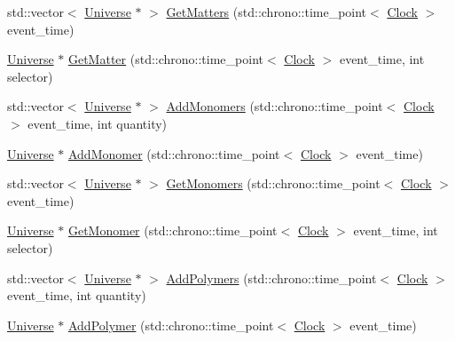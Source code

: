 \begin{DoxyCompactItemize}
\item 
std\+::vector$<$ \mbox{\hyperlink{classUniverse}{Universe}} $\ast$ $>$ \mbox{\hyperlink{classUniverse_a4307a62e183fed8cf2b92be0f6014688}{Get\+Matters}} (std\+::chrono\+::time\+\_\+point$<$ \mbox{\hyperlink{universe_8h_a0ef8d951d1ca5ab3cfaf7ab4c7a6fd80}{Clock}} $>$ event\+\_\+time)
\item 
\mbox{\hyperlink{classUniverse}{Universe}} $\ast$ \mbox{\hyperlink{classUniverse_a69de663cf2e32e65ed28c44ae666db3a}{Get\+Matter}} (std\+::chrono\+::time\+\_\+point$<$ \mbox{\hyperlink{universe_8h_a0ef8d951d1ca5ab3cfaf7ab4c7a6fd80}{Clock}} $>$ event\+\_\+time, int selector)
\item 
std\+::vector$<$ \mbox{\hyperlink{classUniverse}{Universe}} $\ast$ $>$ \mbox{\hyperlink{classUniverse_a95fe7f99971bb2048121a7c4e87b9f79}{Add\+Monomers}} (std\+::chrono\+::time\+\_\+point$<$ \mbox{\hyperlink{universe_8h_a0ef8d951d1ca5ab3cfaf7ab4c7a6fd80}{Clock}} $>$ event\+\_\+time, int quantity)
\item 
\mbox{\hyperlink{classUniverse}{Universe}} $\ast$ \mbox{\hyperlink{classUniverse_a062a9472f0400e566ecc7dc056d989d9}{Add\+Monomer}} (std\+::chrono\+::time\+\_\+point$<$ \mbox{\hyperlink{universe_8h_a0ef8d951d1ca5ab3cfaf7ab4c7a6fd80}{Clock}} $>$ event\+\_\+time)
\item 
std\+::vector$<$ \mbox{\hyperlink{classUniverse}{Universe}} $\ast$ $>$ \mbox{\hyperlink{classUniverse_aca82a914e0f8bd7cd1ec80a7220f0a0e}{Get\+Monomers}} (std\+::chrono\+::time\+\_\+point$<$ \mbox{\hyperlink{universe_8h_a0ef8d951d1ca5ab3cfaf7ab4c7a6fd80}{Clock}} $>$ event\+\_\+time)
\item 
\mbox{\hyperlink{classUniverse}{Universe}} $\ast$ \mbox{\hyperlink{classUniverse_aaa03fb8178d790afd992dd094bb64b47}{Get\+Monomer}} (std\+::chrono\+::time\+\_\+point$<$ \mbox{\hyperlink{universe_8h_a0ef8d951d1ca5ab3cfaf7ab4c7a6fd80}{Clock}} $>$ event\+\_\+time, int selector)
\item 
std\+::vector$<$ \mbox{\hyperlink{classUniverse}{Universe}} $\ast$ $>$ \mbox{\hyperlink{classUniverse_aed7cb25507d516a2821ebb69d5345c54}{Add\+Polymers}} (std\+::chrono\+::time\+\_\+point$<$ \mbox{\hyperlink{universe_8h_a0ef8d951d1ca5ab3cfaf7ab4c7a6fd80}{Clock}} $>$ event\+\_\+time, int quantity)
\item 
\mbox{\hyperlink{classUniverse}{Universe}} $\ast$ \mbox{\hyperlink{classUniverse_a4ea0af5d2eb7b5070a83f7da29526fbd}{Add\+Polymer}} (std\+::chrono\+::time\+\_\+point$<$ \mbox{\hyperlink{universe_8h_a0ef8d951d1ca5ab3cfaf7ab4c7a6fd80}{Clock}} $>$ event\+\_\+time)

\end{DoxyCompactItemize}
